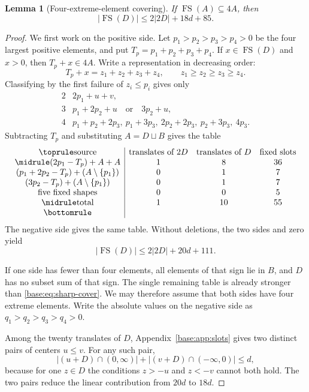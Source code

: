 \documentclass[11pt,a4paper]{article}
\newtheorem{lemma}[theorem]{Lemma}
\theoremstyle{remark}
\newcommand{\FS}{\operatorname{FS}}
\newcommand{\card}[1]{\lvert #1\rvert}
\begin{document}
\begin{lemma}[Four-extreme-element covering]\label{base:lem:cover-count}
If $\FS(A)\subseteq4A$, then
\begin{equation}
 \boxed{\card{\FS(D)}\leq2\card{2D}+18d+85.}
 \label{base:eq:sharp-cover}
\end{equation}
\end{lemma}

\begin{proof}
We first work on the positive side.  Let
$p_1>p_2>p_3>p_4>0$ be the four largest positive elements, and put
$T_p=p_1+p_2+p_3+p_4$.  If $x\in\FS(D)$ and $x>0$, then
$T_p+x\in4A$.  Write a representation in decreasing order:
\[
 T_p+x=z_1+z_2+z_3+z_4,
 \qquad z_1\geq z_2\geq z_3\geq z_4.
\]
Classifying by the first failure of $z_i\leq p_i$ gives only
\[
\begin{array}{c|l}
2&2p_1+u+v,\\
3&p_1+2p_2+u\quad\text{or}\quad3p_2+u,\\
4&p_1+p_2+2p_3,\ p_1+3p_3,\ 2p_2+2p_3,\ p_2+3p_3,\ 4p_3.
\end{array}
\]
Subtracting $T_p$ and substituting $A=D\sqcup B$ gives the table
\[
\begin{array}{c|ccc}
\toprule
\text{source}&\text{translates of }2D&\text{translates of }D&\text{fixed slots}\\
\midrule
(2p_1-T_p)+A+A&1&8&36\\
(p_1+2p_2-T_p)+(A\setminus\{p_1\})&0&1&7\\
(3p_2-T_p)+(A\setminus\{p_1\})&0&1&7\\
\text{five fixed shapes}&0&0&5\\
\midrule
\text{total}&1&10&55\\
\bottomrule
\end{array}
\]
The negative side gives the same table.  Without deletions, the two sides and
zero yield
\begin{equation}
 \card{\FS(D)}\leq2\card{2D}+20d+111.
 \label{base:eq:raw-cover}
\end{equation}

If one side has fewer than four elements, all elements of that sign lie in
$B$, and $D$ has no subset sum of that sign.  The single remaining table is
already stronger than \eqref{base:eq:sharp-cover}.  We may therefore assume that
both sides have four extreme elements.  Write the absolute values on the
negative side as $q_1>q_2>q_3>q_4>0$.

Among the twenty translates of $D$, Appendix~\ref{base:app:slots} gives two
distinct pairs of centers $u\leq v$.  For any such pair,
\begin{equation}
 \card{(u+D)\cap(0,\infty)}+
 \card{(v+D)\cap(-\infty,0)}\leq d,
 \label{base:eq:halfline}
\end{equation}
because for one $z\in D$ the conditions $z>-u$ and $z<-v$ cannot both hold.
The two pairs reduce the linear contribution from $20d$ to $18d$.


\end{proof}
\end{document}
